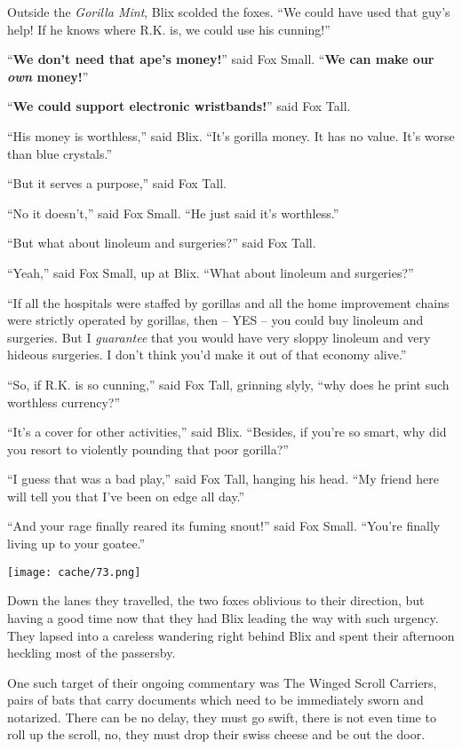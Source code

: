 \documentclass[12pt,twoside]{report}
\begin{document}
Outside the {\em Gorilla Mint}, Blix scolded the foxes.  ``We could
have used that guy's help!  If he knows where R.K. is, we could use
his cunning!''

``{\bf We don't need that ape's money!}'' said Fox Small.  ``{\bf We
  can make our {\em own} money!}''

``{\bf We could support electronic wristbands!}'' said Fox Tall.

``His money is worthless,'' said Blix.  ``It's gorilla money.  It has
no value.  It's worse than blue crystals.''

``But it serves a purpose,'' said Fox Tall.

``No it doesn't,'' said Fox Small.  ``He just said it's worthless.''

``But what about linoleum and surgeries?'' said Fox Tall.

``Yeah,'' said Fox Small, up at Blix.  ``What about linoleum and
surgeries?''

``If all the hospitals were staffed by gorillas and all the home
improvement chains were strictly operated by gorillas, then -- YES --
you could buy linoleum and surgeries.  But I {\em guarantee} that you
would have very sloppy linoleum and very hideous surgeries.  I don't
think you'd make it out of that economy alive.''

``So, if R.K. is so cunning,'' said Fox Tall, grinning slyly, ``why
does he print such worthless currency?''

``It's a cover for other activities,'' said Blix.  ``Besides, if
you're so smart, why did you resort to violently pounding that poor
gorilla?''

``I guess that was a bad play,'' said Fox Tall, hanging his head.
``My friend here will tell you that I've been on edge all day.''

``And your rage finally reared its fuming snout!'' said Fox Small.
``You're finally living up to your goatee.''

	\texttt{[image: cache/73.png]}

Down the lanes they travelled, the two foxes oblivious to their
direction, but having a good time now that they had Blix leading the
way with such urgency.  They lapsed into a careless wandering right
behind Blix and spent their afternoon heckling most of the passersby.

One such target of their ongoing commentary was The Winged Scroll
Carriers, pairs of bats that carry documents which need to be
immediately sworn and notarized.  There can be no delay, they must go
swift, there is not even time to roll up the scroll, no, they must
drop their swiss cheese and be out the door.
\end{document}
